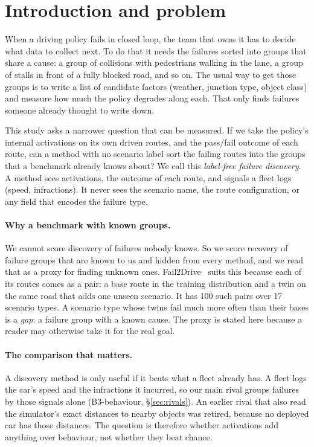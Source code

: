 \section{Introduction and problem}
\label{sec:intro}

When a driving policy fails in closed loop, the team that owns it has to decide
what data to collect next. To do that it needs the failures sorted into groups
that share a cause: a group of collisions with pedestrians walking in the lane, a
group of stalls in front of a fully blocked road, and so on. The usual way to get
those groups is to write a list of candidate factors (weather, junction type,
object class) and measure how much the policy degrades along each. That only finds
failures someone already thought to write down.

This study asks a narrower question that can be measured. If we take the policy's
internal activations on its own driven routes, and the pass/fail outcome of each
route, can a method with no scenario label sort the failing routes into the
groups that a benchmark already knows about? We call this \emph{label-free
failure discovery}. A method sees activations, the outcome of each route, and
signals a fleet logs (speed, infractions). It never sees the scenario name, the
route configuration, or any field that encodes the failure type.

\paragraph{Why a benchmark with known groups.}
We cannot score discovery of failures nobody knows. So we score recovery of
failure groups that are known to us and hidden from every method, and we read
that as a proxy for finding unknown ones. Fail2Drive~\cite{gerstenecker2026fail2drive}
suits this because each of its routes comes as a pair: a base route in the
training distribution and a twin on the same road that adds one unseen scenario.
It has 100 such pairs over 17 scenario types. A scenario type whose twins fail
much more often than their bases is a \emph{gap}: a failure group with a known
cause. The proxy is stated here because a reader may otherwise take it for the
real goal.

\paragraph{The comparison that matters.}
A discovery method is only useful if it beats what a fleet already has. A fleet
logs the car's speed and the infractions it incurred, so our main rival groups
failures by those signals alone (B3-behaviour, \S\ref{sec:rivals}). An earlier
rival that also read the simulator's exact distances to nearby objects was
retired, because no deployed car has those distances. The question is therefore
whether activations add anything over behaviour, not whether they beat chance.


